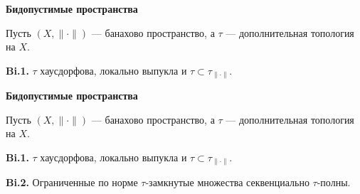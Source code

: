 \documentclass[11pt]{article}
\begin{document}
\newpage

\begin{center}
{\color{notaeYELLOW}\bfseries\fontsize{44}{52}\selectfont Бидопустимые пространства}
\end{center}
\vspace*{\fill}
\begin{center}
\fontsize{36}{43}\selectfont
\parbox{\linewidth}{\centering\noindent Пусть $(X,\|\cdot\|)$ --- банахово пространство, а $\tau$ --- дополнительная топология на $X$.
\par}\vspace{0.4in}
\parbox{\linewidth}{\centering\noindent \textbf{Bi.1.} $\tau$ хаусдорфова, локально выпукла и $\tau\subset\tau_{\|\cdot\|}$.
\par}\vspace{0.4in}
\end{center}
\vspace*{\fill}

\newpage

\begin{center}
{\color{notaeYELLOW}\bfseries\fontsize{44}{52}\selectfont Бидопустимые пространства}
\end{center}
\vspace*{\fill}
\begin{center}
\fontsize{36}{43}\selectfont
\parbox{\linewidth}{\centering\noindent Пусть $(X,\|\cdot\|)$ --- банахово пространство, а $\tau$ --- дополнительная топология на $X$.
\par}\vspace{0.4in}
\parbox{\linewidth}{\centering\noindent \textbf{Bi.1.} $\tau$ хаусдорфова, локально выпукла и $\tau\subset\tau_{\|\cdot\|}$.
\par}\vspace{0.4in}
\parbox{\linewidth}{\centering\noindent \textbf{Bi.2.} Ограниченные по норме $\tau$-замкнутые множества секвенциально $\tau$-полны.
\par}\vspace{0.4in}
\end{center}
\vspace*{\fill}

\newpage
\end{document}
